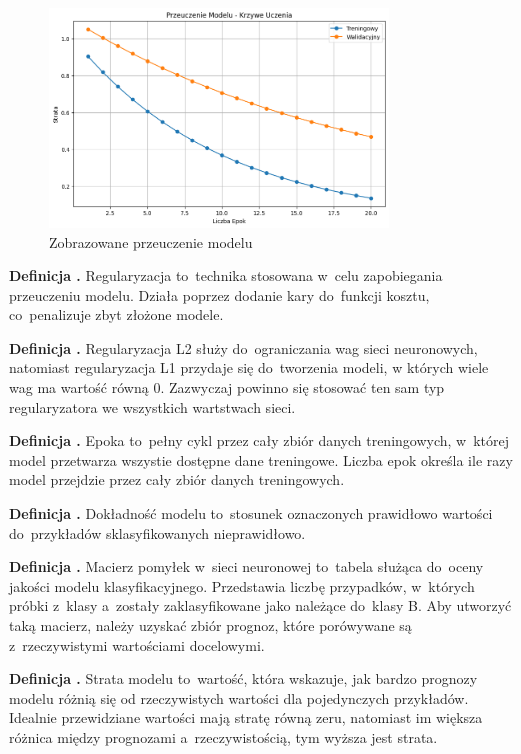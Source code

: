 \begin{figure}[ht]
	\centering
	\includegraphics[width=9cm]{resources/machine-learning/images/def_overfit.png}
	\caption{Zobrazowane przeuczenie modelu}
    \label{Fig:def-2}
\end{figure}
\FloatBarrier

\noindent
\textbf{Definicja .}
\incrementdefinitionIndex
Regularyzacja to~technika stosowana w~celu zapobiegania przeuczeniu modelu.
Działa poprzez dodanie kary do~funkcji kosztu, co~penalizuje zbyt złożone modele.

\noindent
\textbf{Definicja .}
\incrementdefinitionIndex
Regularyzacja L2 służy do~ograniczania wag sieci neuronowych,
natomiast regularyzacja L1 przydaje się do~tworzenia modeli, w których wiele wag ma wartość równą 0. 
Zazwyczaj powinno się stosować ten sam typ regularyzatora we wszystkich wartstwach sieci.

\noindent
\textbf{Definicja .}
\incrementdefinitionIndex
Epoka to~pełny cykl przez cały zbiór danych treningowych, w~której model przetwarza wszystie dostępne dane treningowe.
Liczba epok określa ile razy model przejdzie przez cały zbiór danych treningowych.

\noindent
\textbf{Definicja .}
\incrementdefinitionIndex
Dokładność modelu to~stosunek oznaczonych prawidłowo wartości do~przykładów sklasyfikowanych nieprawidłowo.

\noindent
\textbf{Definicja .}
\incrementdefinitionIndex
Macierz pomyłek w~sieci neuronowej to~tabela służąca do~oceny jakości modelu klasyfikacyjnego.
Przedstawia liczbę przypadków, w~których próbki z~klasy a~zostały zaklasyfikowane jako należące do~klasy B.
Aby utworzyć taką macierz, należy uzyskać zbiór prognoz, które porówywane są z~rzeczywistymi wartościami docelowymi.

\noindent
\textbf{Definicja .}
\incrementdefinitionIndex
Strata modelu to~wartość, która wskazuje,
jak bardzo prognozy modelu różnią się od rzeczywistych wartości dla pojedynczych przykładów.
Idealnie przewidziane wartości mają stratę równą zeru,
natomiast im większa różnica między prognozami a~rzeczywistością, tym wyższa jest strata.

